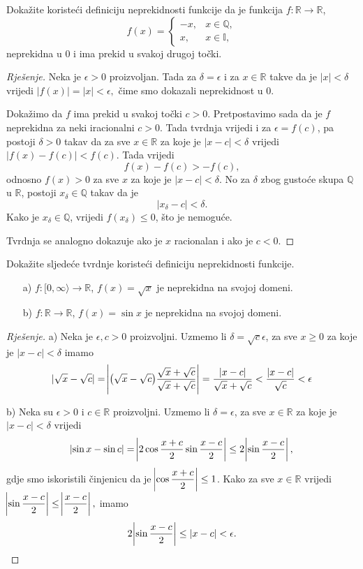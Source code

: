 \begin{exercise}
Dokažite koristeći definiciju neprekidnosti funkcije da je funkcija $f : \mathbb{R}\to\mathbb{R}$,
$$f(x)=\begin{cases}
-x, & x\in \mathbb{Q},\\
x, & x\in \mathbb{I},
\end{cases}$$
neprekidna u $0$ i ima prekid u svakoj drugoj točki.
\end{exercise}
\newpage
\begin{proof}[Rješenje]
Neka je $\epsilon>0$ proizvoljan. Tada za $\delta=\epsilon$ i za $x\in \mathbb{R}$ takve da je $|x|<\delta$ vrijedi $|f(x)|=|x|<\epsilon,$ čime smo dokazali neprekidnost u $0$.

Dokažimo da $f$ ima prekid u svakoj točki $c>0$. Pretpostavimo sada da je $f$ neprekidna za neki iracionalni $c>0$. Tada tvrdnja vrijedi i za $\epsilon=f(c)$, pa postoji $\delta>0$ takav da za sve $x\in \mathbb{R}$ za koje je $|x-c|<\delta$ vrijedi $|f(x)-f(c)|<f(c)$. Tada vrijedi $$f(x)-f(c)>-f(c),$$ odnosno $f(x)>0$ za sve $x$ za koje je $|x-c|<\delta$. No za $\delta$ zbog gustoće skupa $\mathbb{Q}$ u $\mathbb{R}$, postoji $x_\delta\in \mathbb{Q}$ takav da je $$|x_\delta-c|<\delta.$$ Kako je $x_\delta\in \mathbb{Q}$, vrijedi $f(x_\delta)\leq 0$, što je nemoguće. 

Tvrdnja se analogno dokazuje ako je $x$ racionalan i ako je $c<0$.
\end{proof}
\begin{exercise}
\label{cont4}
Dokažite sljedeće tvrdnje koristeći definiciju neprekidnosti funkcije. 
\begin{itemize}
\item[a)] $f : [0,\infty \rangle\to \mathbb{R}$, $f(x)=\sqrt{x}$ je neprekidna na svojoj domeni.
\item[b)] $f : \mathbb{R} \to \mathbb{R}$, $f(x)=\sin{x}$ je neprekidna na svojoj domeni.
\end{itemize}
\end{exercise}
\begin{proof}[Rješenje]
a) Neka je $\epsilon, c>0$ proizvoljni. Uzmemo li $\delta=\sqrt{c}\epsilon$, za sve $x\geq 0$ za koje je $|x-c|<\delta$ imamo
$$|\sqrt{x}-\sqrt{c}|=\abs{\left(\sqrt{x}-\sqrt{c}\right)\dfrac{\sqrt{x}+\sqrt{c}}{\sqrt{x}+\sqrt{c}}}=\dfrac{|x-c|}{\sqrt{x}+\sqrt{c}}<\dfrac{|x-c|}{\sqrt{c}}<\epsilon$$

b) Neka su $\epsilon>0$ i $c\in \mathbb{R}$ proizvoljni. Uzmemo li $\delta=\epsilon$, za sve $x\in \mathbb{R}$ za koje je $|x-c|<\delta$ vrijedi
$$\abs{\sin{x}-\sin{c}}=\abs{2\cos{\dfrac{x+c}{2}}\sin{\dfrac{x-c}{2}}}\leq 2\abs{\sin{\dfrac{x-c}{2}}},$$
gdje smo iskoristili činjenicu da je $\abs{\cos{\dfrac{x+c}{2}}}\leq 1$. Kako za sve $x\in \mathbb{R}$ vrijedi $\abs{\sin{\dfrac{x-c}{2}}}\leq \abs{\dfrac{x-c}{2}},$ imamo $$2\abs{\sin{\dfrac{x-c}{2}}}\leq |x-c|<\epsilon.$$
\end{proof}
